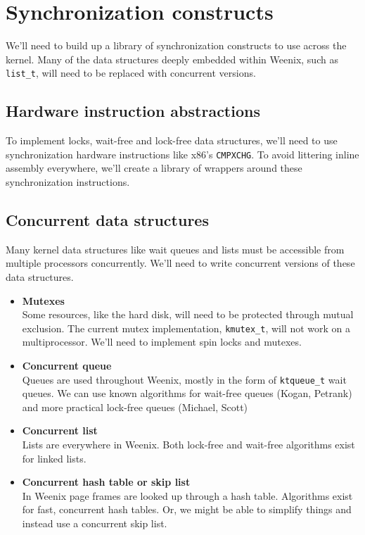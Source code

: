 \documentclass{article}
\begin{document}
\section{Synchronization constructs}

We'll need to build up a library of synchronization constructs to use across the kernel. Many of
the data structures deeply embedded within Weenix, such as {\tt{list\_t}}, will need to be
replaced with concurrent versions.

\subsection{Hardware instruction abstractions}

To implement locks, wait-free and lock-free data structures, we'll need to use synchronization 
hardware instructions like x86's {\tt{CMPXCHG}}. To avoid littering inline assembly everywhere,
we'll create a library of wrappers around these synchronization instructions.

\subsection{Concurrent data structures}

Many kernel data structures like wait queues and lists must be accessible from multiple
processors concurrently. We'll need to write concurrent versions of these data structures.

\begin{itemize}
    \item \textbf{Mutexes}\\
    Some resources, like the hard disk, will need to be protected through mutual exclusion. The current mutex
    implementation, {\tt{kmutex\_t}}, will not work on a multiprocessor. We'll need to implement
    spin locks and mutexes.
    \item \textbf{Concurrent queue}\\
    Queues are used throughout Weenix, mostly in the form of {\tt{ktqueue\_t}} wait queues. We can
    use known algorithms for wait-free queues (Kogan, Petrank) and more practical lock-free queues (Michael, Scott) 
    \item \textbf{Concurrent list}\\
    Lists are everywhere in Weenix. Both lock-free and wait-free algorithms exist for linked lists.
    \item \textbf{Concurrent hash table or skip list}\\
    In Weenix page frames are looked up through a hash table. Algorithms exist for fast, concurrent hash tables. Or,
    we might be able to simplify things and instead use a concurrent skip list.
\end{itemize}
\end{document}
